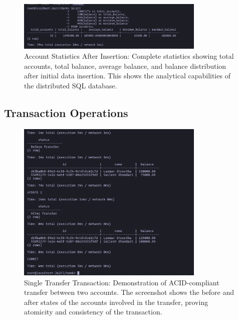 \begin{figure}[H]
  \centering
  \includegraphics[width=0.8\textwidth]{task-5/screenshots/account-stats.png}
  \caption{Account Statistics After Insertion: Complete statistics showing total accounts, total balance, average balance, and balance distribution after initial data insertion. This shows the analytical capabilities of the distributed SQL database.}
  \label{fig:task5-account-stats}
\end{figure}

\subsection*{Transaction Operations}

\begin{figure}[H]
  \centering
  \includegraphics[width=0.8\textwidth]{task-5/screenshots/single-transfer.png}
  \caption{Single Transfer Transaction: Demonstration of ACID-compliant transfer between two accounts. The screenshot shows the before and after states of the accounts involved in the transfer, proving atomicity and consistency of the transaction.}
  \label{fig:task5-single-transfer}
\end{figure}

